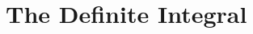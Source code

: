 \section{The Definite Integral} \label{S:4.3.DefiniteIntegral}



\newpage



\newpage



\newpage



\newpage

\clearpage
